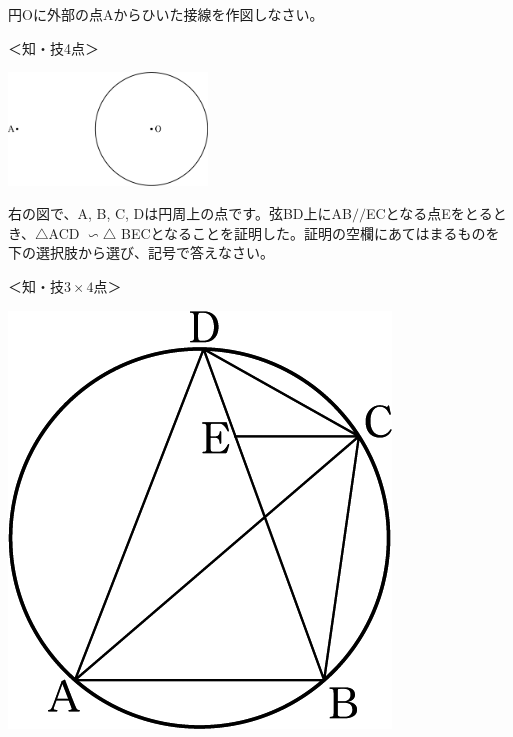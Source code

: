 \documentclass[
  12pt,a4paper,lualatex,ja=standard]{bxjsarticle}
\begin{document}
\begin{flushleft}
\vfill

\newpage

\noindent{} \hspace{1pt}円Oに外部の点Aからひいた接線を作図しなさい。

%
\begin{flushright}%
\footnotesize{＜知・技4点＞}%
\end{flushright}%


\begin{center}
\def\@captype{figure}
\includegraphics[height=30mm]{img/image12.png}

\end{center}

\vspace{5mm}

\begin{multicols}{2}

\noindent{} \hspace{1pt}右の図で、A,  B,  C, Dは円周上の点です。弦BD上にAB$/\!/$ECとなる点Eをとるとき、$\triangle$ACD $\mathrel{\text{∽}}\triangle$ BECとなることを証明した。証明の空欄にあてはまるものを下の選択肢から選び、記号で答えなさい。　

%
\begin{flushright}%
\footnotesize{＜知・技$3 \times 4$点＞}%
\end{flushright}%


\vfill \null

\columnbreak

\begin{center}
\def\@captype{figure}
\includegraphics{img/image118.png}


\end{center}
\end{multicols}
\end{flushleft}
\end{document}
